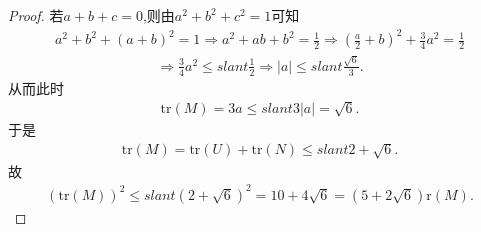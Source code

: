 \documentclass[../../main.tex]{subfiles}
\begin{document}
\begin{proof}
若$a+b+c=0$,则由$a^2+b^2+c^2=1$可知
\begin{align*}
a^2+b^2+(a+b)^2=1\Rightarrow a^2+ab+b^2=\frac{1}{2}\Rightarrow \left( \frac{a}{2}+b \right) ^2+\frac{3}{4}a^2=\frac{1}{2}
\end{align*}
\begin{align*}
\Rightarrow \frac{3}{4}a^2\leqslant slant \frac{1}{2}\Rightarrow |a|\leqslant slant \frac{\sqrt{6}}{3}.
\end{align*}
从而此时
\begin{align*}
\mathrm{tr}(M) =3a\leqslant slant 3|a|=\sqrt{6}.
\end{align*}
于是
\begin{align*}
\mathrm{tr}(M) =\mathrm{tr}(U) +\mathrm{tr}(N) \leqslant slant 2+\sqrt{6}.
\end{align*}
故
\begin{align*}
(\mathrm{tr}(M))^2\leqslant slant \left( 2+\sqrt{6} \right) ^2=10+4\sqrt{6}=\left( 5+2\sqrt{6} \right) \mathrm{r}(M).
\end{align*}
\end{proof}
\end{document}
